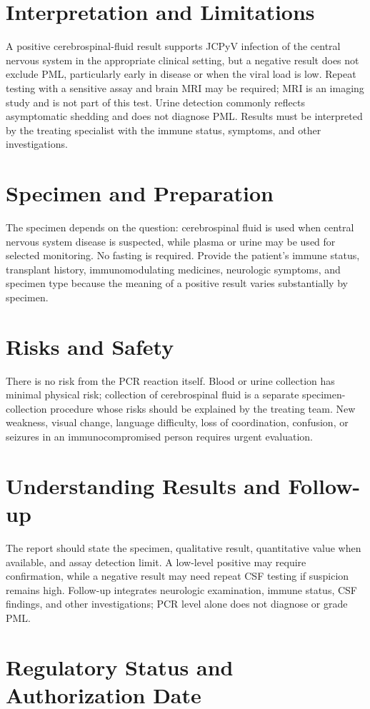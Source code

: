 \section*{Interpretation and Limitations}
A positive cerebrospinal-fluid result supports JCPyV infection of the central nervous system in the appropriate clinical setting, but a negative result does not exclude PML, particularly early in disease or when the viral load is low. Repeat testing with a sensitive assay and brain MRI may be required; MRI is an imaging study and is not part of this test. Urine detection commonly reflects asymptomatic shedding and does not diagnose PML. Results must be interpreted by the treating specialist with the immune status, symptoms, and other investigations.
\section*{Specimen and Preparation}
The specimen depends on the question: cerebrospinal fluid is used when central nervous system disease is suspected, while plasma or urine may be used for selected monitoring. No fasting is required. Provide the patient's immune status, transplant history, immunomodulating medicines, neurologic symptoms, and specimen type because the meaning of a positive result varies substantially by specimen.

\section*{Risks and Safety}
There is no risk from the PCR reaction itself. Blood or urine collection has minimal physical risk; collection of cerebrospinal fluid is a separate specimen-collection procedure whose risks should be explained by the treating team. New weakness, visual change, language difficulty, loss of coordination, confusion, or seizures in an immunocompromised person requires urgent evaluation.

\section*{Understanding Results and Follow-up}
The report should state the specimen, qualitative result, quantitative value when available, and assay detection limit. A low-level positive may require confirmation, while a negative result may need repeat CSF testing if suspicion remains high. Follow-up integrates neurologic examination, immune status, CSF findings, and other investigations; PCR level alone does not diagnose or grade PML.

\section*{Regulatory Status and Authorization Date}

\clearpage
